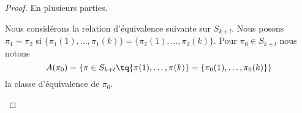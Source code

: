 \begin{proof}
	En plusieurs parties.
	\begin{subproof}
		Nous considérons la relation d'équivalence suivante sur \( S_{k+l}\). Nous posons \( \pi_1\sim\pi_2\) si \( \{ \pi_1(1),\ldots,\pi_1(k) \}=\{ \pi_2(1),\ldots,\pi_2(k) \}\). Pour \( \pi_0\in S_{k+l}\) nous notons
		\begin{equation}
			A(\pi_0)=\{ \pi\in S_{k+l}\tq \{ \pi(1),\ldots,\pi(k) \}=\{ \pi_0(1),\ldots, \pi_0(k)\} \}
		\end{equation}
		la classe d'équivalence de \( \pi_0\).



\end{subproof}
\end{proof}
